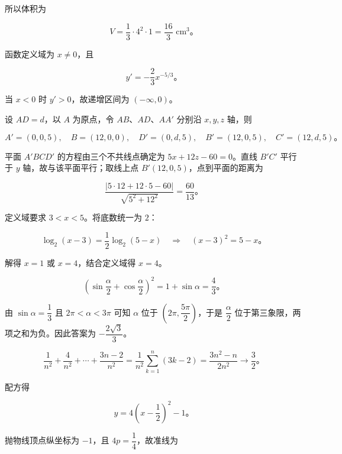 \begin{answer}
所以体积为

\nopagebreak[4]
\[
V=\frac13\cdot4^2\cdot1=\frac{16}3\text{ cm}^3\text{。}
\]


函数定义域为 $x\ne0$，且

\nopagebreak[4]
\[
y'=-\frac23x^{-5/3}\text{。}
\]

当 $x<0$ 时 $y'>0$，故递增区间为 $(-\infty,0)$。


设 $AD=d$，以 $A$ 为原点，令 $AB$、$AD$、$AA'$ 分别沿 $x,y,z$ 轴，则

\nopagebreak[4]
\[
A'=(0,0,5),\quad B=(12,0,0),\quad D'=(0,d,5),\quad B'=(12,0,5),\quad C'=(12,d,5)\text{。}
\]

平面 $A'BCD'$ 的方程由三个不共线点确定为 $5x+12z-60=0$。直线 $B'C'$ 平行于 $y$ 轴，故与该平面平行；取线上点 $B'(12,0,5)$，点到平面的距离为

\nopagebreak[4]
\[
\frac{|5\cdot12+12\cdot5-60|}{\sqrt{5^2+12^2}}=\frac{60}{13}\text{。}
\]


定义域要求 $3<x<5$。将底数统一为 $2$：

\nopagebreak[4]
\[
\log_2(x-3)=\frac12\log_2(5-x)
\quad\Longrightarrow\quad
(x-3)^2=5-x\text{。}
\]

解得 $x=1$ 或 $x=4$，结合定义域得 $x=4$。


\nopagebreak[4]
\[
\left(\sin\frac\alpha2+\cos\frac\alpha2\right)^2
=1+\sin\alpha=\frac43\text{。}
\]

由 $\sin\alpha=\dfrac13$ 且 $2\pi<\alpha<3\pi$ 可知 $\alpha$ 位于 $(2\pi,\dfrac{5\pi}2)$，于是 $\dfrac\alpha2$ 位于第三象限，两项之和为负。因此答案为 $-\dfrac{2\sqrt3}3$。


\nopagebreak[4]
\[
\frac1{n^2}+\frac4{n^2}+\cdots+\frac{3n-2}{n^2}
=\frac1{n^2}\sum_{k=1}^n(3k-2)
=\frac{3n^2-n}{2n^2}\longrightarrow\frac32\text{。}
\]


配方得

\nopagebreak[4]
\[
y=4\left(x-\frac12\right)^2-1\text{。}
\]

抛物线顶点纵坐标为 $-1$，且 $4p=\dfrac14$，故准线为


\end{answer}

